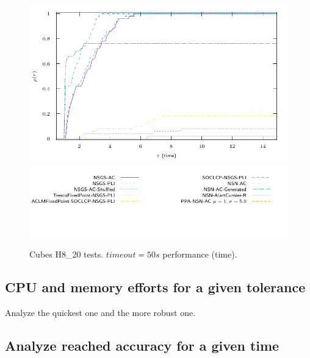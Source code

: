 \begin{figure}
  \centering
  \includegraphics[width=\widthfigure\textwidth]{../figure/profile-LMGC_Cubes_H8_20-time_0_100.pdf}
  \includegraphics[width=\widthfigure\textwidth]{../figure/profile-LMGC_Cubes_H8_20_legend-time.pdf}
  \caption{Cubes H8\_20 tests. $timeout=50s $ performance (time). }
  \label{fig:profile-LMGC_Cubes_H8_20-time}
\end{figure}


\subsection{CPU and memory efforts for a given tolerance}

Analyze the quickest one and the more robust one.

\subsection{Analyze reached accuracy for a given time}








